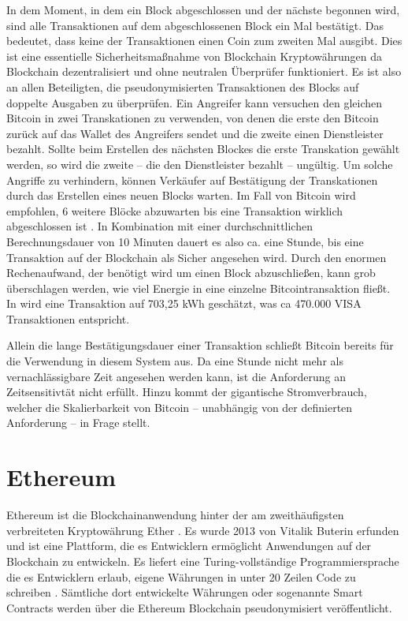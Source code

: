 \documentclass[
	fontsize=11pt,
	headings=small,
	parskip=half,           %
	bibliography=totoc,
	numbers=noenddot,       %
	open=any,               %
]{scrreprt}
\begin{document}
In dem Moment, in dem ein Block abgeschlossen und der nächste begonnen wird, sind alle Transaktionen auf dem abgeschlossenen Block ein Mal bestätigt. Das bedeutet, dass keine der Transaktionen einen Coin zum zweiten Mal ausgibt. Dies ist eine essentielle Sicherheitsmaßnahme von Blockchain Kryptowährungen da Blockchain dezentralisiert und ohne neutralen Überprüfer funktioniert. Es ist also an allen Beteiligten, die pseudonymisierten Transaktionen des Blocks auf doppelte Ausgaben zu überprüfen. Ein Angreifer kann versuchen den gleichen Bitcoin in zwei Transkationen zu verwenden, von denen die erste den Bitcoin zurück auf das Wallet des Angreifers sendet und die zweite einen Dienstleister bezahlt. Sollte beim Erstellen des nächsten Blockes die erste Transkation gewählt werden, so wird die zweite -- die den Dienstleister bezahlt -- ungültig. Um solche Angriffe zu verhindern, können Verkäufer auf Bestätigung der Transkationen durch das Erstellen eines neuen Blocks warten. Im Fall von Bitcoin wird empfohlen, 6 weitere Blöcke abzuwarten bis eine Transaktion wirklich abgeschlossen ist \cite{btc-Zaghloul2019Bitcoin}. In Kombination mit einer durchschnittlichen Berechnungsdauer von 10 Minuten dauert es also ca. eine Stunde, bis eine Transaktion auf der Blockchain als Sicher angesehen wird.
Durch den enormen Rechenaufwand, der benötigt wird um einen Block abzuschließen, kann grob überschlagen werden, wie viel Energie in eine einzelne Bitcointransaktion fließt. In \cite{btc-energyConsumption} wird eine Transaktion auf 703,25 kWh geschätzt, was ca 470.000 VISA Transaktionen entspricht.

Allein die lange Bestätigungsdauer einer Transaktion schließt Bitcoin bereits für die Verwendung in diesem System aus. Da eine Stunde nicht mehr als vernachlässigbare Zeit angesehen werden kann, ist die Anforderung an Zeitsensitivtät nicht erfüllt. Hinzu kommt der gigantische Stromverbrauch, welcher die Skalierbarkeit von Bitcoin -- unabhängig von der definierten Anforderung -- in Frage stellt. 

\section{Ethereum}
\label{sec:ethereum}
Ethereum ist die Blockchainanwendung hinter der am zweithäufigsten verbreiteten Kryptowährung Ether \cite{eth-marketCapitalisation}. Es wurde 2013 von Vitalik Buterin erfunden und ist eine Plattform, die es Entwicklern ermöglicht Anwendungen auf der Blockchain zu entwickeln. Es liefert eine Turing-vollständige Programmiersprache die es Entwicklern erlaub, eigene Währungen in unter 20 Zeilen Code zu schreiben \cite{eth-buterin2013ethereum}. Sämtliche dort entwickelte Währungen oder sogenannte Smart Contracts werden über die Ethereum Blockchain pseudonymisiert veröffentlicht. 
\end{document}
